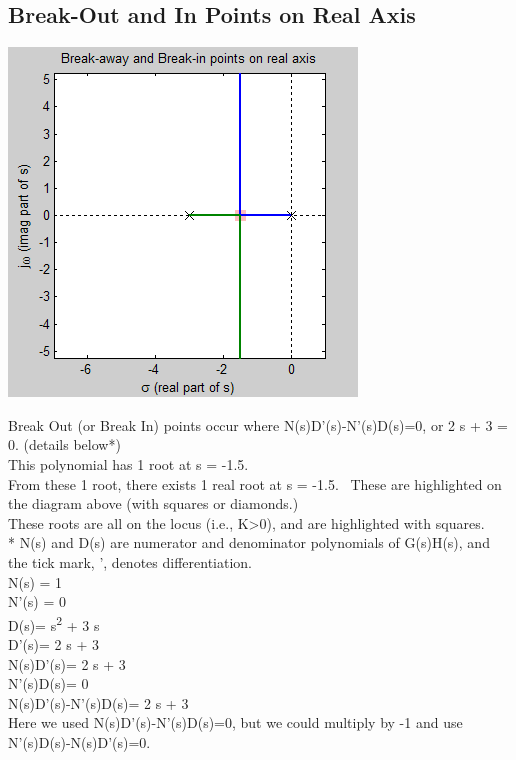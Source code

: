 \documentclass[16pt]{article}
\begin{document}
\subsection[Break-Out and In Points on Real
Axis]{\texorpdfstring{\protect\hypertarget{RuleBrk}{}{}Break-Out and In
Points on Real
Axis}{Break-Out and In Points on Real Axis}}\label{break-out-and-in-points-on-real-axis}

\includegraphics{./Root Locus_ Example 1_files/RLBreakOutIn.png}

Break Out (or Break In) points occur where N(s)D'(s)-N'(s)D(s)=0, or 2 s
+ 3 = 0. (details below*)\\[2\baselineskip]This polynomial has 1 root at
s = -1.5.\\[2\baselineskip]From these 1 root, there exists 1 real root
at s = -1.5.~ These are highlighted on the diagram above (with squares
or diamonds.)\\[2\baselineskip]These roots are all on the locus (i.e.,
K\textgreater{}0), and are highlighted with squares.\\[2\baselineskip]*
N(s) and D(s) are numerator and denominator polynomials of G(s)H(s), and
the tick mark, ', denotes differentiation.\\
N(s) = 1\\
N'(s) = 0\\
D(s)= s\textsuperscript{2} + 3 s\\
D'(s)= 2 s + 3\\
N(s)D'(s)= 2 s + 3\\
N'(s)D(s)= 0\\
N(s)D'(s)-N'(s)D(s)= 2 s + 3\\[2\baselineskip]Here we used
N(s)D'(s)-N'(s)D(s)=0, but we could multiply by -1 and use
N'(s)D(s)-N(s)D'(s)=0.\\
\end{document}
